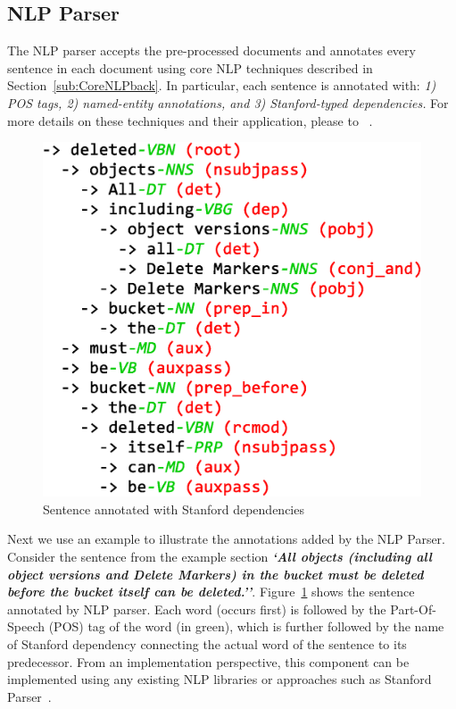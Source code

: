 \subsection{NLP Parser}


The NLP parser accepts the pre-processed documents and annotates every sentence in each document using core NLP techniques described in Section~\ref{sub:CoreNLPback}.
In particular, each sentence is annotated with: \textit{1) POS tags, 2) named-entity annotations, and 3) Stanford-typed dependencies.}
For more details on these techniques and their application, please to ~\cite{Marneffe06LREC, Marneffe08COLING, pandita12:inferring, pandita13:WHYPER, thummalapentaICSE12}. 


\begin{figure}
	\centering
		\includegraphics[scale=0.3]{StanfordAnnotated.eps}
	\caption{Sentence annotated with Stanford dependencies}
	\label{fig:standep}
\end{figure}

Next we use an example to illustrate the annotations added by the NLP Parser. Consider the sentence from the example section \textbf{\textit{`All objects (including all object versions and Delete Markers) in the bucket must be deleted before the bucket itself can be deleted.''}}. Figure~\ref{fig:standep} shows the sentence annotated by NLP parser. Each word (occurs first) is followed by the Part-Of-Speech (POS) tag of the word (in green), which is further followed by the name of Stanford dependency connecting the actual word of the sentence to its predecessor.
From an implementation perspective, this component can be implemented using any existing NLP libraries or approaches such as Stanford Parser~\cite{SNLP1}.

